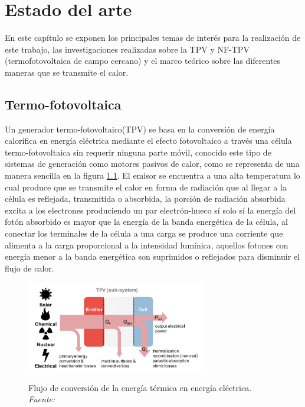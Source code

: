 \chapter{Estado del arte}
En este capítulo se exponen los principales temas de interés para la realización de este trabajo, las investigaciones realizadas sobre la TPV y NF-TPV (termofotovoltaica de campo cercano) y el marco teórico sobre las diferentes maneras que se transmite el calor.

\section{Termo-fotovoltaica}
Un generador termo-fotovoltaico(TPV) se basa en la conversión de energía calorífica en energía eléctrica mediante el efecto fotovoltaico a través una célula termo-fotovoltaica sin requerir ninguna parte móvil, conocido este tipo de sistemas de generación como motores pasivos de calor, como se representa de una manera sencilla en la figura \ref{fig:TPV_Subsistema}. El emisor se encuentra a una alta temperatura lo cual produce que se transmite el calor en forma de radiación que al llegar a la célula es reflejada, transmitida o absorbida, la porción de radiación absorbida excita a los electrones produciendo un par electrón-hueco sí solo sí la energía del fotón absorbido es mayor que la energía de la banda energética de la célula, al conectar los terminales de la célula a una carga se produce una corriente que alimenta a la carga proporcional a la intensidad lumínica, aquellos fotones con energía menor a la banda energética son suprimidos o reflejados para disminuir el flujo de calor\cite{Present_Efficiencies_and_Future_Opportunities_in_Thermophotovoltaics}.\\

\begin{figure}[H]
	\centering
	\includegraphics[width=0.7\textwidth]{figuras/TPV_Subsistema.png}
	\label{fig:TPV_Subsistema}
	\caption{Flujo de conversión de la energía térmica en energía eléctrica. \textit{Fuente: \cite{Present_Efficiencies_and_Future_Opportunities_in_Thermophotovoltaics}}}
\end{figure}

